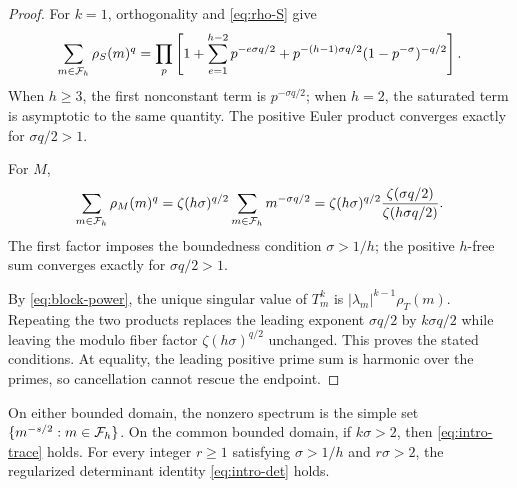 \begin{proof}
For $k=1$, orthogonality and \cref{eq:rho-S} give
\begin{equation}
  \sum_{m\in\mathcal F_h}\rho_S(m)^q
  =\prod_p\left[
    1+\sum_{e=1}^{h-2}p^{-e\sigma q/2}
    +p^{-(h-1)\sigma q/2}(1-p^{-\sigma})^{-q/2}
    \right].
  \label{eq:S-schatten-product}
\end{equation}
When $h\ge3$, the first nonconstant term is $p^{-\sigma q/2}$; when
$h=2$, the saturated term is asymptotic to the same quantity.  The positive
Euler product converges exactly for $\sigma q/2>1$.

For $M$,
\begin{equation}
  \sum_{m\in\mathcal F_h}\rho_M(m)^q
  =\zeta(h\sigma)^{q/2}
    \sum_{m\in\mathcal F_h}m^{-\sigma q/2}
  =\zeta(h\sigma)^{q/2}
    \frac{\zeta(\sigma q/2)}{\zeta(h\sigma q/2)}.
  \label{eq:M-schatten-product}
\end{equation}
The first factor imposes the boundedness condition $\sigma>1/h$; the
positive $h$-free sum converges exactly for $\sigma q/2>1$.

By \cref{eq:block-power}, the unique singular value of $T_m^k$ is
$|\lambda_m|^{k-1}\rho_T(m)$.  Repeating the two products replaces the
leading exponent $\sigma q/2$ by $k\sigma q/2$ while leaving the modulo
fiber factor $\zeta(h\sigma)^{q/2}$ unchanged.  This proves the stated
conditions.  At equality, the leading positive prime sum is harmonic over
the primes, so cancellation cannot rescue the endpoint.
\end{proof}

\begin{proposition}
\label{prop:cyclic}
On either bounded domain, the nonzero spectrum is the simple set
$\{m^{-s/2}:m\in\mathcal F_h\}$.  On the common bounded domain, if $k\sigma>2$,
then \cref{eq:intro-trace} holds.  For every integer $r\ge1$ satisfying
$\sigma>1/h$ and $r\sigma>2$, the regularized determinant identity
\cref{eq:intro-det} holds.
\end{proposition}

